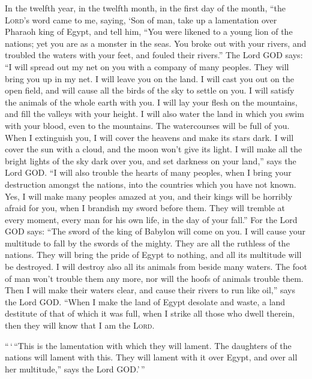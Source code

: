  In the twelfth year, in the twelfth month, in the first
day of the month, ``the \textsc{Lord}'s word came to me, saying,
 `Son of man, take up a lamentation over Pharaoh king of
Egypt, and tell him, ``You were likened to a young lion of the nations;
yet you are as a monster in the seas. You broke out with your rivers,
and troubled the waters with your feet, and fouled their rivers.''
 The Lord GOD says: ``I will spread out my net on you with
a company of many peoples. They will bring you up in my net.
 I will leave you on the land. I will cast you out on the
open field, and will cause all the birds of the sky to settle on you. I
will satisfy the animals of the whole earth with you.  I
will lay your flesh on the mountains, and fill the valleys with your
height.  I will also water the land in which you swim with
your blood, even to the mountains. The watercourses will be full of you.
 When I extinguish you, I will cover the heavens and make
its stars dark. I will cover the sun with a cloud, and the moon won't
give its light.  I will make all the bright lights of the
sky dark over you, and set darkness on your land,'' says the Lord GOD.
 ``I will also trouble the hearts of many peoples, when I
bring your destruction amongst the nations, into the countries which you
have not known.  Yes, I will make many peoples amazed at
you, and their kings will be horribly afraid for you, when I brandish my
sword before them. They will tremble at every moment, every man for his
own life, in the day of your fall.''  For the Lord GOD
says: ``The sword of the king of Babylon will come on you.
 I will cause your multitude to fall by the swords of the
mighty. They are all the ruthless of the nations. They will bring the
pride of Egypt to nothing, and all its multitude will be destroyed.
 I will destroy also all its animals from beside many
waters. The foot of man won't trouble them any more, nor will the hoofs
of animals trouble them.  Then I will make their waters
clear, and cause their rivers to run like oil,'' says the Lord GOD.
 ``When I make the land of Egypt desolate and waste, a
land destitute of that of which it was full, when I strike all those who
dwell therein, then they will know that I am the \textsc{Lord}.

 ``\,`\,``This is the lamentation with which they will
lament. The daughters of the nations will lament with this. They will
lament with it over Egypt, and over all her multitude,'' says the Lord
GOD.'\,''

